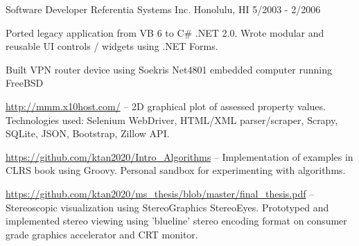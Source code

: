 \documentclass[11pt, a4paper]{awesome-cv}
\begin{document}
\begin{cventries}
  \cventry
    {Software Developer} %
    {Referentia Systems Inc.} %
    {Honolulu, HI} %
    {5/2003 - 2/2006} %
    {
      \begin{cvitems} %
        \item {Ported legacy application from VB 6 to C\# .NET 2.0. Wrote modular and reusable UI controls / widgets using .NET Forms.}
        \item {Built VPN router device using Soekris Net4801 embedded computer running FreeBSD}
      \end{cvitems}      
    }

\end{cventries}


\begin{cventries}

  \cventry
    {} %
    {} %
    {} %
    {} %
    {
      \begin{cvitems} %
        \item {\href{http://mmm.x10host.com/}{http://mmm.x10host.com/} -- 2D graphical plot of assessed property values. Technologies used: Selenium WebDriver, HTML/XML parser/scraper, Scrapy, SQLite, JSON, Bootstrap, Zillow API.}        
        \item {\href{https://github.com/ktan2020/Intro\_Algorithms}{https://github.com/ktan2020/Intro\_Algorithms} -- Implementation of examples in CLRS book using Groovy. Personal sandbox for experimenting with algorithms.}
        \item {\href{https://github.com/ktan2020/ms\_thesis/blob/master/final\_thesis.pdf}{https://github.com/ktan2020/ms\_thesis/blob/master/final\_thesis.pdf} -- Stereoscopic visualization using StereoGraphics StereoEyes. Prototyped and implemented stereo viewing using 'blueline' stereo encoding format on consumer grade graphics accelerator and CRT monitor.}
      \end{cvitems}      
    }

\end{cventries}
\end{document}
